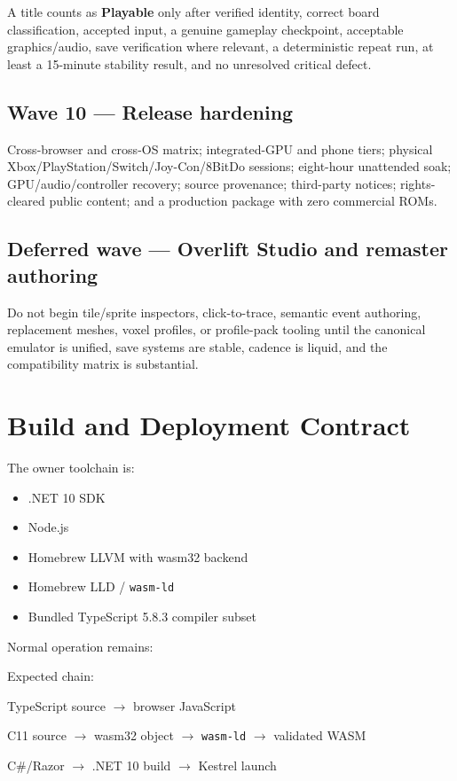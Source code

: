 \documentclass[10pt,letterpaper]{article}
\newcommand{\code}[1]{\texttt{\small #1}}
\begin{document}
A title counts as \textbf{Playable} only after verified identity, correct board classification, accepted input, a genuine gameplay checkpoint, acceptable graphics/audio, save verification where relevant, a deterministic repeat run, at least a 15-minute stability result, and no unresolved critical defect.

\subsection{Wave 10 --- Release hardening}
Cross-browser and cross-OS matrix; integrated-GPU and phone tiers; physical Xbox/PlayStation/Switch/Joy-Con/8BitDo sessions; eight-hour unattended soak; GPU/audio/controller recovery; source provenance; third-party notices; rights-cleared public content; and a production package with zero commercial ROMs.

\subsection{Deferred wave --- Overlift Studio and remaster authoring}
Do not begin tile/sprite inspectors, click-to-trace, semantic event authoring, replacement meshes, voxel profiles, or profile-pack tooling until the canonical emulator is unified, save systems are stable, cadence is liquid, and the compatibility matrix is substantial.

\section{Build and Deployment Contract}

The owner toolchain is:
\begin{itemize}
\item .NET 10 SDK
\item Node.js
\item Homebrew LLVM with wasm32 backend
\item Homebrew LLD / \code{wasm-ld}
\item Bundled TypeScript 5.8.3 compiler subset
\end{itemize}

Normal operation remains:
\begin{center}
\end{center}

Expected chain:
\begin{center}
TypeScript source $\rightarrow$ browser JavaScript\par
C11 source $\rightarrow$ wasm32 object $\rightarrow$ \code{wasm-ld} $\rightarrow$ validated WASM\par
C\#/Razor $\rightarrow$ .NET 10 build $\rightarrow$ Kestrel launch
\end{center}
\end{document}
